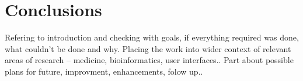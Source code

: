 \chapter{Conclusions}
Refering to introduction and checking with goals, if everything required was
done, what couldn't be done and why. Placing the work into wider context of
relevant areas of research -- medicine, bioinformatics, user interfaces..
Part about possible plans for future, improvment, enhancements, folow
up..
